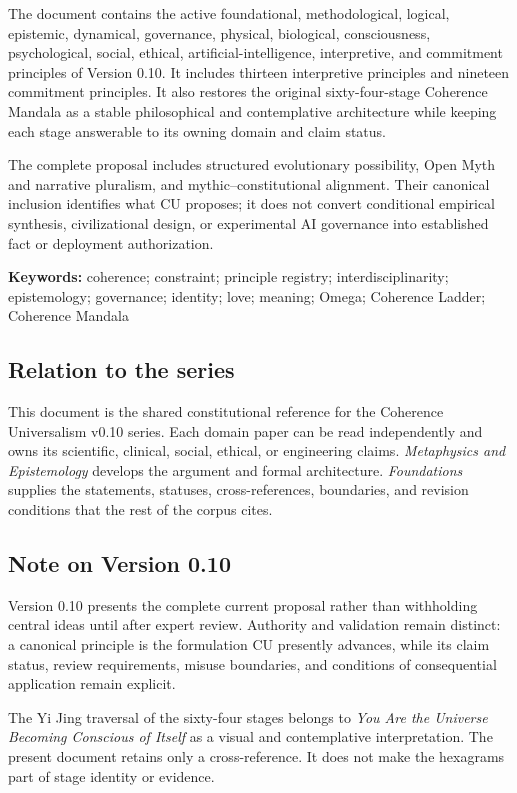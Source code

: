 \documentclass[
  11pt,
]{article}
\begin{document}
The document contains the active foundational, methodological, logical,
epistemic, dynamical, governance, physical, biological, consciousness,
psychological, social, ethical, artificial-intelligence, interpretive,
and commitment principles of Version 0.10. It includes thirteen
interpretive principles and nineteen commitment principles. It also
restores the original sixty-four-stage Coherence Mandala as a stable
philosophical and contemplative architecture while keeping each stage
answerable to its owning domain and claim status.

The complete proposal includes structured evolutionary possibility, Open
Myth and narrative pluralism, and mythic--constitutional alignment.
Their canonical inclusion identifies what CU proposes; it does not
convert conditional empirical synthesis, civilizational design, or
experimental AI governance into established fact or deployment
authorization.

\textbf{Keywords:} coherence; constraint; principle registry;
interdisciplinarity; epistemology; governance; identity; love; meaning;
Omega; Coherence Ladder; Coherence Mandala

\subsection{Relation to the series}\label{relation-to-the-series}

This document is the shared constitutional reference for the Coherence
Universalism v0.10 series. Each domain paper can be read independently
and owns its scientific, clinical, social, ethical, or engineering
claims. \emph{Metaphysics and Epistemology} develops the argument and
formal architecture. \emph{Foundations} supplies the statements,
statuses, cross-references, boundaries, and revision conditions that the
rest of the corpus cites.

\subsection{Note on Version 0.10}\label{note-on-version-0.10}

Version 0.10 presents the complete current proposal rather than
withholding central ideas until after expert review. Authority and
validation remain distinct: a canonical principle is the formulation CU
presently advances, while its claim status, review requirements, misuse
boundaries, and conditions of consequential application remain explicit.

The Yi Jing traversal of the sixty-four stages belongs to \emph{You Are
the Universe Becoming Conscious of Itself} as a visual and contemplative
interpretation. The present document retains only a cross-reference. It
does not make the hexagrams part of stage identity or evidence.
\end{document}
